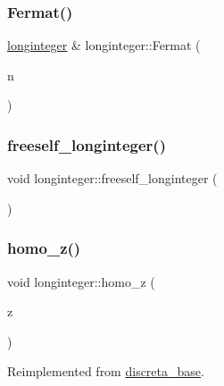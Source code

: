 \mbox{\label{classlonginteger_ae120eb593e762937a8f45ca3643ed49c}} 
\subsubsection{\texorpdfstring{Fermat()}{Fermat()}}
{\footnotesize\ttfamily \mbox{\hyperlink{classlonginteger}{longinteger}} \& longinteger\+::\+Fermat (\begin{DoxyParamCaption}\item[{\mbox{\hyperlink{galois_8h_a09fddde158a3a20bd2dcadb609de11dc}{I\+NT}}}]{n }\end{DoxyParamCaption})}

\mbox{\label{classlonginteger_a82006f4b7c6bf897de0387497e16c219}} 
\subsubsection{\texorpdfstring{freeself\+\_\+longinteger()}{freeself\_longinteger()}}
{\footnotesize\ttfamily void longinteger\+::freeself\+\_\+longinteger (\begin{DoxyParamCaption}{ }\end{DoxyParamCaption})}

\mbox{\label{classlonginteger_a986e829bf35eca2b9f24b1b3766d5677}} 
\subsubsection{\texorpdfstring{homo\+\_\+z()}{homo\_z()}}
{\footnotesize\ttfamily void longinteger\+::homo\+\_\+z (\begin{DoxyParamCaption}\item[{\mbox{\hyperlink{galois_8h_a09fddde158a3a20bd2dcadb609de11dc}{I\+NT}}}]{z }\end{DoxyParamCaption})\hspace{0.3cm}{\ttfamily [virtual]}}



Reimplemented from \mbox{\hyperlink{classdiscreta__base_a40e349b2d85c5c6dba9c015d16a0e801}{discreta\+\_\+base}}.

